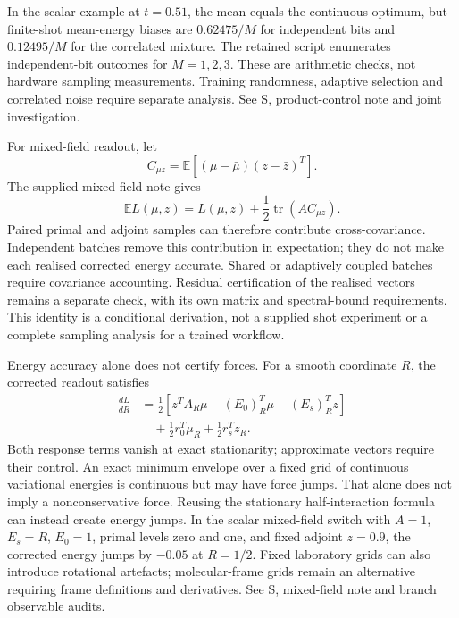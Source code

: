 \documentclass{article}
\begin{document}
In the scalar example at $t=0.51$, the mean equals the continuous optimum, but finite-shot mean-energy biases are $0.62475/M$ for independent bits and $0.12495/M$ for the correlated mixture. The retained script enumerates independent-bit outcomes for $M=1,2,3$. These are arithmetic checks, not hardware sampling measurements. Training randomness, adaptive selection and correlated noise require separate analysis. See S, product-control note and joint investigation.

For mixed-field readout, let
\begin{equation}
C_{\mu z}=\mathbb E[(\mu-\bar\mu)(z-\bar z)^T].
\end{equation}
The supplied mixed-field note gives
\begin{equation}
\mathbb E L(\mu,z)=L(\bar\mu,\bar z)+\frac12\operatorname{tr}(AC_{\mu z}).
\end{equation}
Paired primal and adjoint samples can therefore contribute cross-covariance. Independent batches remove this contribution in expectation; they do not make each realised corrected energy accurate. Shared or adaptively coupled batches require covariance accounting. Residual certification of the realised vectors remains a separate check, with its own matrix and spectral-bound requirements. This identity is a conditional derivation, not a supplied shot experiment or a complete sampling analysis for a trained workflow.

Energy accuracy alone does not certify forces. For a smooth coordinate $R$, the corrected readout satisfies
\begin{align}
\frac{dL}{dR}&=\frac12\left[z^TA_R\mu-(E_0)_R^T\mu-(E_s)_R^Tz\right]\\
&\quad+\frac12r_0^T\mu_R+\frac12r_s^Tz_R.
\end{align}
Both response terms vanish at exact stationarity; approximate vectors require their control. An exact minimum envelope over a fixed grid of continuous variational energies is continuous but may have force jumps. That alone does not imply a nonconservative force. Reusing the stationary half-interaction formula can instead create energy jumps. In the scalar mixed-field switch with $A=1$, $E_s=R$, $E_0=1$, primal levels zero and one, and fixed adjoint $z=0.9$, the corrected energy jumps by $-0.05$ at $R=1/2$. Fixed laboratory grids can also introduce rotational artefacts; molecular-frame grids remain an alternative requiring frame definitions and derivatives. See S, mixed-field note and branch observable audits.
\end{document}
